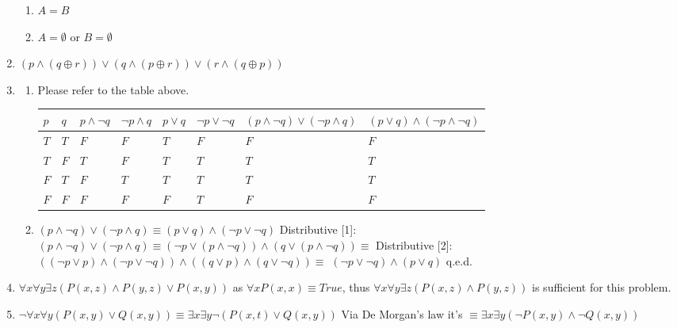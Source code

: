 \documentclass[12pt]{article}
\begin{document}
\begin{enumerate}
\begin{enumerate}
      \item $A = B$
      \item $A = \emptyset$ or $B = \emptyset$
    \end{enumerate}
  \item
    $(p \land (q \oplus r)) \lor (q \land (p \oplus r)) \lor (r \land (q \oplus p))$
  \item
    \begin{enumerate}
      \item
        Please refer to the table above.
        \begin{table}[]
          \begin{tabular}{l|l|l|l|l|l|l|l}
          $p$ & $q$ & $p \land \neg q$ & $\neg p \land q$ & $p \lor q$ &  $\neg p \lor \neg q$ & $(p \land \neg q) \lor (\neg p \land q)$ & $(p \lor q) \land (\neg p \land \neg q)$ \\ \hline
          $T$ & $T$ & $F$ & $F$ & $T$ & $F$ & $F$ & $F$ \\ \hline
          $T$ & $F$ & $T$ & $F$ & $T$ & $T$ & $T$ & $T$ \\ \hline
          $F$ & $T$ & $F$ & $T$ & $T$ & $T$ & $T$ & $T$ \\ \hline
          $F$ & $F$ & $F$ & $F$ & $F$ & $T$ & $F$ & $F$ 
          \end{tabular}
        \end{table}
      \item
        $(p \land \neg q) \lor (\neg p \land q) \equiv (p \lor q) \land (\neg p \lor \neg q)$
        \newline Distributive [1]:
        $(p \land \neg q) \lor (\neg p \land q) \equiv (\neg p \lor (p \land \neg q)) \land (q \lor (p \land \neg q)) \equiv$
        \newline Distributive [2]:
        $((\neg p \lor p) \land (\neg p \lor \neg q)) \land ((q \lor p) \land (q \lor \neg q)) \equiv$
        $(\neg p \lor \neg q) \land (p \lor q)$ \newline q.e.d.
    \end{enumerate}
  \item
    $\forall x \forall y \exists z (P(x, z) \land P(y, z) \lor P(x, y))$
    \newline
    as $\forall x P(x, x) \equiv True$, thus $\forall x \forall y \exists z (P(x, z) \land P(y, z))$ is sufficient for this problem.
  \item
    $\neg \forall x \forall y (P(x, y) \lor Q(x, y)) \equiv \exists x \exists y \neg (P(x, t) \lor Q(x, y))$
    \newline Via De Morgan's law it's $\equiv \exists x \exists y (\neg P(x, y) \land \neg Q(x, y))$
\end{enumerate}
\end{document}
